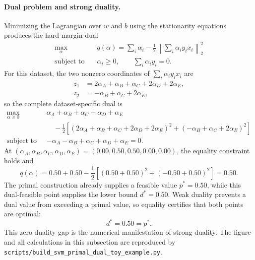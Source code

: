 \documentclass[11pt,a4paper]{article}
\numberwithin{equation}{section} %
\begin{document}
\paragraph{Dual problem and strong duality.}
Minimizing the Lagrangian over $w$ and $b$ using the stationarity equations
produces the hard-margin dual
\begin{equation}
\begin{aligned}
\max_{\alpha}\quad
&q(\alpha)=\sum_i\alpha_i
-\frac12\left\lVert\sum_i\alpha_i y_i x_i\right\rVert_2^2\\
\text{subject to}\quad
&\alpha_i\geq0,\qquad \sum_i\alpha_i y_i=0.
\end{aligned}
\end{equation}
For this dataset, the two nonzero coordinates of
$\sum_i\alpha_i y_i x_i$ are
\begin{equation}
\begin{aligned}
z_1&=2\alpha_A+\alpha_B+\alpha_C+2\alpha_D+2\alpha_E,\\
z_2&=-\alpha_B+\alpha_C+2\alpha_E,
\end{aligned}
\end{equation}
so the complete dataset-specific dual is
\begin{equation}
\begin{aligned}
\max_{\alpha\geq0}\quad
&\alpha_A+\alpha_B+\alpha_C+\alpha_D+\alpha_E\\
&\quad-\frac12\left[
(2\alpha_A+\alpha_B+\alpha_C+2\alpha_D+2\alpha_E)^2
 +(-\alpha_B+\alpha_C+2\alpha_E)^2\right]\\
\text{subject to}\quad
&-\alpha_A-\alpha_B+\alpha_C+\alpha_D+\alpha_E=0.
\end{aligned}
\end{equation}
At $(\alpha_A,\alpha_B,\alpha_C,\alpha_D,\alpha_E)
=(0.00,0.50,0.50,0.00,0.00)$, the equality constraint holds and
\begin{equation}
    q(\alpha)
    =0.50+0.50-\frac12[(0.50+0.50)^2+(-0.50+0.50)^2]
    =0.50.
\end{equation}
The primal construction already supplies a feasible value $p^*=0.50$, while
this dual-feasible point supplies the lower bound $d^*=0.50$. Weak duality
prevents a dual value from exceeding a primal value, so equality certifies
that both points are optimal:
\begin{equation}
    \boxed{d^*=0.50=p^*}.
\end{equation}
This zero duality gap is the numerical manifestation of strong duality. The
figure and all calculations in this subsection are reproduced by
\texttt{scripts/build\_svm\_primal\_dual\_toy\_example.py}.
\end{document}
